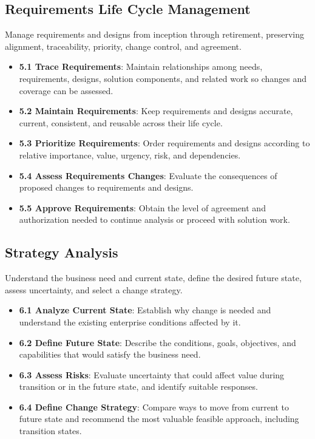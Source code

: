 \documentclass[11pt]{article}
\begin{document}
\subsection{Requirements Life Cycle Management}
Manage requirements and designs from inception through retirement, preserving alignment, traceability, priority, change control, and agreement.
\begin{itemize}
\item \textbf{5.1 Trace Requirements}: Maintain relationships among needs, requirements, designs, solution components, and related work so changes and coverage can be assessed.
\item \textbf{5.2 Maintain Requirements}: Keep requirements and designs accurate, current, consistent, and reusable across their life cycle.
\item \textbf{5.3 Prioritize Requirements}: Order requirements and designs according to relative importance, value, urgency, risk, and dependencies.
\item \textbf{5.4 Assess Requirements Changes}: Evaluate the consequences of proposed changes to requirements and designs.
\item \textbf{5.5 Approve Requirements}: Obtain the level of agreement and authorization needed to continue analysis or proceed with solution work.
\end{itemize}
\subsection{Strategy Analysis}
Understand the business need and current state, define the desired future state, assess uncertainty, and select a change strategy.
\begin{itemize}
\item \textbf{6.1 Analyze Current State}: Establish why change is needed and understand the existing enterprise conditions affected by it.
\item \textbf{6.2 Define Future State}: Describe the conditions, goals, objectives, and capabilities that would satisfy the business need.
\item \textbf{6.3 Assess Risks}: Evaluate uncertainty that could affect value during transition or in the future state, and identify suitable responses.
\item \textbf{6.4 Define Change Strategy}: Compare ways to move from current to future state and recommend the most valuable feasible approach, including transition states.
\end{itemize}
\end{document}
